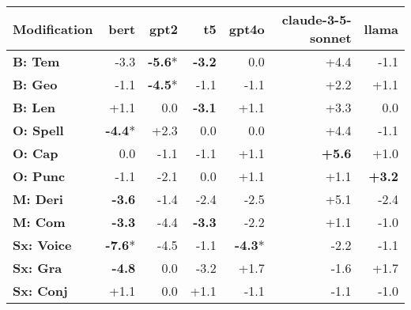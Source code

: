 \begin{table}[h]
\centering
\begin{tabular}{lrrrrrr}
\hline
Modification & \textbf{bert} & \textbf{gpt2} & \textbf{t5} & \textbf{gpt4o} & \textbf{claude-3-5-sonnet} & \textbf{llama} \\
\hline
\textbf{B: Tem} & \cellcolor{red!9} -3.3 & \cellcolor{red!16} \textbf{-5.6}* & \cellcolor{red!9} \textbf{-3.2} & \cellcolor{red!0} 0.0 & \cellcolor{green!13} +4.4 & \cellcolor{red!3} -1.1 \\
\textbf{B: Geo} & \cellcolor{red!3} -1.1 & \cellcolor{red!13} \textbf{-4.5}* & \cellcolor{red!3} -1.1 & \cellcolor{red!3} -1.1 & \cellcolor{green!6} +2.2 & \cellcolor{green!3} +1.1 \\
\textbf{B: Len} & \cellcolor{green!3} +1.1 & \cellcolor{red!0} 0.0 & \cellcolor{red!9} \textbf{-3.1} & \cellcolor{green!3} +1.1 & \cellcolor{green!9} +3.3 & \cellcolor{red!0} 0.0 \\
\hline
\textbf{O: Spell} & \cellcolor{red!13} \textbf{-4.4}* & \cellcolor{green!6} +2.3 & \cellcolor{red!0} 0.0 & \cellcolor{red!0} 0.0 & \cellcolor{green!13} +4.4 & \cellcolor{red!3} -1.1 \\
\textbf{O: Cap} & \cellcolor{red!0} 0.0 & \cellcolor{red!3} -1.1 & \cellcolor{red!3} -1.1 & \cellcolor{green!3} +1.1 & \cellcolor{green!16} \textbf{+5.6} & \cellcolor{green!3} +1.0 \\
\textbf{O: Punc} & \cellcolor{red!3} -1.1 & \cellcolor{red!6} -2.1 & \cellcolor{red!0} 0.0 & \cellcolor{green!3} +1.1 & \cellcolor{green!3} +1.1 & \cellcolor{green!9} \textbf{+3.2} \\
\hline
\textbf{M: Deri} & \cellcolor{red!10} \textbf{-3.6} & \cellcolor{red!4} -1.4 & \cellcolor{red!7} -2.4 & \cellcolor{red!7} -2.5 & \cellcolor{green!15} +5.1 & \cellcolor{red!7} -2.4 \\
\textbf{M: Com} & \cellcolor{red!9} \textbf{-3.3} & \cellcolor{red!13} -4.4 & \cellcolor{red!9} \textbf{-3.3} & \cellcolor{red!6} -2.2 & \cellcolor{green!3} +1.1 & \cellcolor{red!3} -1.0 \\
\hline
\textbf{Sx: Voice} & \cellcolor{red!22} \textbf{-7.6}* & \cellcolor{red!13} -4.5 & \cellcolor{red!3} -1.1 & \cellcolor{red!12} \textbf{-4.3}* & \cellcolor{red!6} -2.2 & \cellcolor{red!3} -1.1 \\
\textbf{Sx: Gra} & \cellcolor{red!14} \textbf{-4.8} & \cellcolor{red!0} 0.0 & \cellcolor{red!9} -3.2 & \cellcolor{green!5} +1.7 & \cellcolor{red!4} -1.6 & \cellcolor{green!5} +1.7 \\
\textbf{Sx: Conj} & \cellcolor{green!3} +1.1 & \cellcolor{red!0} 0.0 & \cellcolor{green!3} +1.1 & \cellcolor{red!3} -1.1 & \cellcolor{red!3} -1.1 & \cellcolor{red!3} -1.0 \\

\end{tabular}
\end{table}
